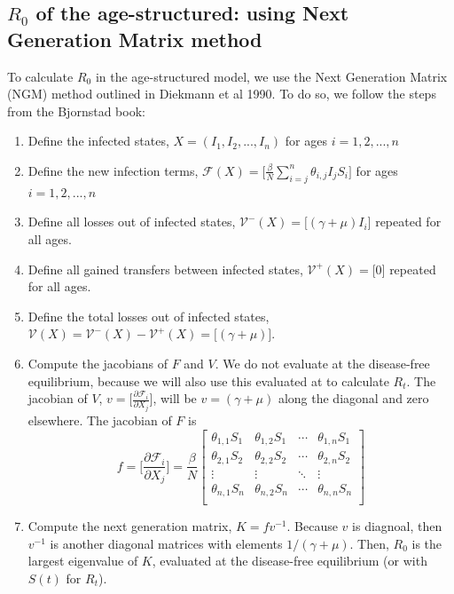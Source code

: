 \documentclass[12pt]{article}
\begin{document}
\subsection{$R_0$ of the age-structured: using Next Generation Matrix method}
To calculate $R_0$ in the age-structured model, we use the Next Generation Matrix (NGM) method outlined in Diekmann et al 1990. To do so, we follow the steps from the Bjornstad book:
\begin{enumerate}
    \item Define the infected states, $X = (I_1, I_2, ..., I_n)$ for ages $i = 1, 2, ..., n$
    \item Define the new infection terms, $\mathcal{F}(X) = \Big[ \frac{\beta}{N}\sum_{i=j}^{n} \theta_{i,j} I_j S_i  \Big]$ for ages $i = 1, 2, ..., n$
    \item Define all losses out of infected states, $\mathcal{V}^-(X) = \Big[ (\gamma + \mu) I_i \Big]$ repeated for all ages.
    \item Define all gained transfers between infected states, $\mathcal{V}^+(X) = \Big[ 0 \Big]$ repeated for all ages.
    \item Define the total losses out of infected states, $\mathcal{V}(X) = \mathcal{V}^-(X) - \mathcal{V}^+(X) = \Big[ (\gamma + \mu) \Big]$.
    \item Compute the jacobians of $F$ and $V$. We do not evaluate at the disease-free equilibrium, because we will also use this  evaluated at to calculate $R_t$. The jacobian of $V$, $v = \Big[\frac{\partial \mathcal{F}_i}{\partial X_j}\Big]$, will be $v = (\gamma + \mu)$ along the diagonal and zero elsewhere.  
    The jacobian of $F$ is
    $$
    f = \Big[\frac{\partial \mathcal{F}_i}{\partial X_j}\Big] = \frac{\beta}{N} \begin{bmatrix}
     \theta_{1,1} S_1 & \theta_{1,2} S_1 & \cdots & \theta_{1,n} S_1 \\
    \theta_{2,1} S_2 & \theta_{2,2} S_2 & \cdots & \theta_{2,n} S_2 \\
    \vdots & \vdots & \ddots & \vdots \\
    \theta_{n,1} S_n & \theta_{n,2} S_n & \cdots & \theta_{n,n} S_n \\
    \end{bmatrix}
    $$
    \item Compute the next generation matrix, $K = f v^{-1}$. Because $v$ is diagnoal, then $v^{-1}$ is another diagonal matrices with elements $1/(\gamma + \mu)$. Then, $R_0$ is the largest eigenvalue of $K$, evaluated at the disease-free equilibrium (or with $S(t)$ for $R_t$).
\end{enumerate}
\end{document}

